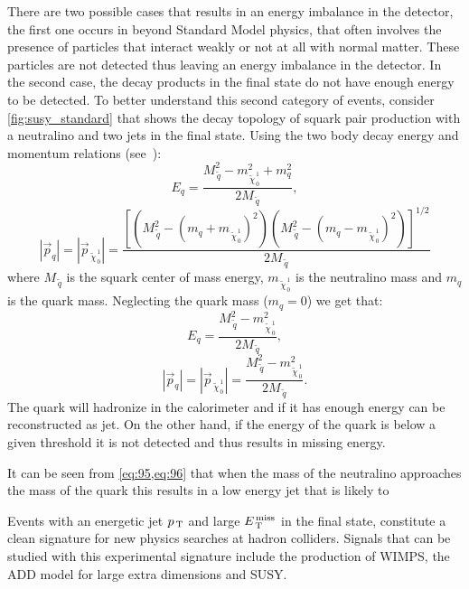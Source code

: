There are two possible cases that results in an energy imbalance in the
detector, the first one occurs in beyond Standard Model physics, that often
involves the presence of particles that interact weakly or not at all with
normal matter. These particles are not detected thus leaving an energy imbalance
in the detector. In the second case, the decay products in the final state do
not have enough energy to be detected. To better understand this second category
of events, consider \cref{fig:susy_standard} that shows the decay topology of
squark pair production with a neutralino and two jets in the final state. Using
the two body decay energy and momentum relations (see~\cite{PDG}):
\begin{equation}
  \label{eq:93}
  E_q = \frac{M_{\, \tilde{q}}^2 - m_{\, \tilde{\chi}_{\, 0}^{\, 1}}^2 + m_q^2}{2
    M_{\, \tilde{q}}},
\end{equation}
\begin{equation}
  \label{eq:94}
  |\vec{p}_q| = |\vec{p}_{\, \tilde{\chi}_{\, 0}^{\, 1}}| = \frac{\left[ \left(
        M_{\, \tilde{q}}^2 - (m_q + m_{\, \tilde{\chi}_{\, 0}^{\, 1}})^2
      \right) \left( M_{\, \tilde{q}}^2 - (m_q - m_{\, \tilde{\chi}_{\, 0}^{\,
            1}})^2 \right) \right]^{1/2}}{2 M_{\, \tilde{q}}}
\end{equation}
where $M_{\, \tilde{q}}$ is the squark center of mass energy,
$m_{\, \tilde{\chi}_{\, 0}^{\, 1}}$ is the neutralino mass and $m_q$ is the
quark mass. Neglecting the quark mass ($m_q = 0$) we get that:
\begin{equation}
  \label{eq:95}
  E_q = \frac{M_{\, \tilde{q}}^2 - m_{\, \tilde{\chi}_{\, 0}^{\, 1}}^2}{2 M_{\,
      \tilde{q}}},
\end{equation}
\begin{equation}
  \label{eq:96}
  |\vec{p}_q| = |\vec{p}_{\, \tilde{\chi}_{\, 0}^{\, 1}}| = \frac{M_{\,
      \tilde{q}}^2 - m_{\, \tilde{\chi}_{\, 0}^{\, 1}}^2}{2 M_{\, \tilde{q}}}.
\end{equation}
The quark will hadronize in the calorimeter and if it has enough energy can be
reconstructed as jet. On the other hand, if the energy of the quark is below a
given threshold it is not detected and thus results in missing energy.

\mbox{}

It can be seen from \cref{eq:95,eq:96} that when the mass of the neutralino
approaches the mass of the quark this results in a low energy jet that is likely
to


Events with an energetic jet $p_\mathrm{\, T}$ and large $E_\mathrm{\, T}^\mathrm{\, miss}$ in the final state, constitute a
clean signature for new physics searches at hadron colliders. Signals that can
be studied with this experimental signature include the production of WIMPS,
the ADD model for large extra dimensions and SUSY.

